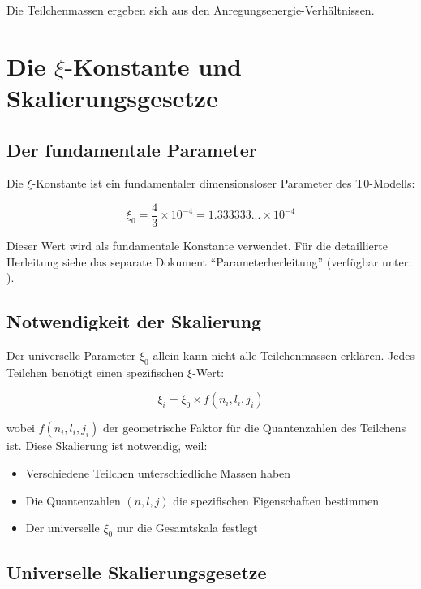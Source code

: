 	Die Teilchenmassen ergeben sich aus den Anregungsenergie-Verhältnissen.
	
	
\section{Die $\xi$-Konstante und Skalierungsgesetze}

\subsection{Der fundamentale Parameter}

Die $\xi$-Konstante ist ein fundamentaler dimensionsloser Parameter des T0-Modells:

\begin{equation}
	\boxed{\xi_0 = \frac{4}{3} \times 10^{-4} = 1.333333... \times 10^{-4}}
\end{equation}

	Dieser Wert wird als fundamentale Konstante verwendet. Für die detaillierte Herleitung 
	siehe das separate Dokument ``Parameterherleitung'' 
	(verfügbar unter: ).

\subsection{Notwendigkeit der Skalierung}

Der universelle Parameter $\xi_0$ allein kann nicht alle Teilchenmassen erklären. Jedes Teilchen benötigt einen spezifischen $\xi$-Wert:

\begin{equation}
	\xi_i = \xi_0 \times f(n_i, l_i, j_i)
\end{equation}

wobei $f(n_i, l_i, j_i)$ der geometrische Faktor für die Quantenzahlen des Teilchens ist. Diese Skalierung ist notwendig, weil:

\begin{itemize}
	\item Verschiedene Teilchen unterschiedliche Massen haben
	\item Die Quantenzahlen $(n, l, j)$ die spezifischen Eigenschaften bestimmen
	\item Der universelle $\xi_0$ nur die Gesamtskala festlegt
\end{itemize}

\subsection{Universelle Skalierungsgesetze}

